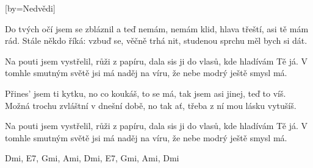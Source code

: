 [by={Nedvědi}]

\beginverse{}
Do tvých očí jsem se zbláznil a teď nemám, nemám klid,
hlava třeští, asi tě mám rád.
Stále někdo říká: vzbuď se, věčně trhá nit,
studenou sprchu měl bych si dát.
\endverse{}

\beginchorus{}
Na pouti jsem vystřelil, růži z papíru,
dala sis ji do vlasů, kde hladívám Tě já.
V tomhle smutným světě jsi má naděj na víru,
že nebe modrý ještě smysl má.
\endchorus{}

\beginverse{}
Přines' jsem ti kytku, no co koukáš, to se má,
tak jsem asi jinej, teď to víš.
Možná trochu zvláštní v dnešní době, no tak ať,
třeba z ní mou lásku vytušíš.
\endverse{}

\beginchorus{}
Na pouti jsem vystřelil, růži z papíru,
dala sis ji do vlasů, kde hladívám Tě já.
V tomhle smutným světě jsi má naděj na víru,
že nebe modrý ještě smysl má.
\endchorus{}

\beginchorus{}
Dmi, E7, Gmi, Ami, Dmi, E7, Gmi, Ami, Dmi
\endchorus{}

\beginchorus{}
\phantom{}
\endchorus{}

\endsong{}
